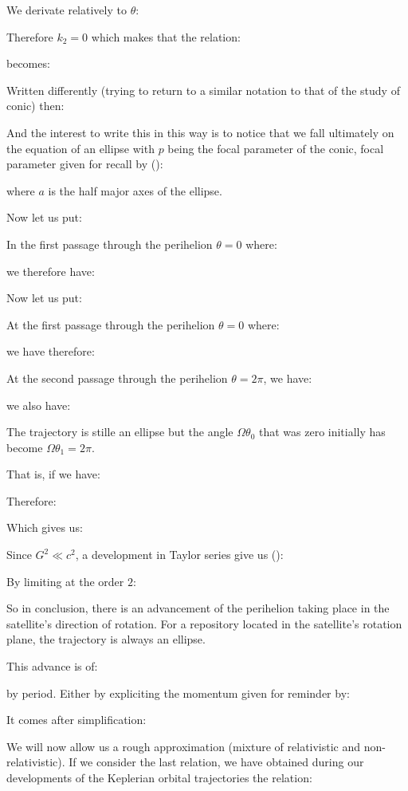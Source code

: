 	We derivate relatively to $\theta$:
	
	Therefore $k_2=0$ which makes that the relation:
	
	becomes:
	
	Written differently (trying to return to a similar notation to that of the study of conic) then:
	
	And the interest to write this in this way is to notice that we fall ultimately on the equation of an ellipse with $p$ being the focal parameter of the conic, focal parameter given for recall by ():
	
	where $a$ is the half major axes of the ellipse.
	
	Now let us put:
	
	In the first passage through the perihelion $\theta=0$ where:
	
	we therefore have:
	
	Now let us put:
	
	At the first passage through the perihelion $\theta=0$ where:
	
	we have therefore:
	
	At the second passage through the perihelion $\theta=2\pi$, we have:
	
	we also have:
	
	The trajectory is stille an ellipse but the angle $\Omega\theta_0$ that was zero initially has become $\Omega\theta_1=2\pi$.

	That is, if we have:
	
	Therefore:
	
	Which gives us:
	
	Since $G^2\ll c^2$, a development in Taylor series give us ():
	
	By limiting at the order $2$:
	
	So in conclusion, there is an advancement of the perihelion taking place in the satellite's direction of rotation. For a repository located in the satellite's rotation plane, the trajectory is always an ellipse.

	This advance is of:
	
	by period. Either by expliciting the momentum given for reminder by:
	
	It comes after simplification:
	
	We will now allow us a rough approximation (mixture of relativistic and non-relativistic). If we consider the last relation, we have obtained during our developments of the Keplerian orbital trajectories the relation:
	
